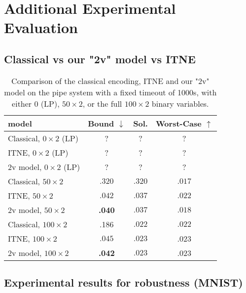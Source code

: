 	\section{Additional Experimental Evaluation}
	

\subsection{Classical vs our "2v" model vs ITNE}




\begin{table}[h!]
	\centering
	\begin{tabular}{||l|c|c|c||}\hline\hline
		model &        Bound $\downarrow$ &  Sol. &      Worst-Case $\uparrow$ \\\hline \hline
	Classical, $0 \times 2$ (LP)&  ? & ? & ?
    \\\hline
	ITNE, $0 \times 2$ (LP) &    ? & ? & ?
    \\\hline
	2v model, $0 \times 2$ (LP) &    ? & ? & ?
    \\\hline \hline
	
		Classical, $50 \times 2$ &    $.320$ &  $.320$ & $.017$ 
    \\\hline
	ITNE, $50 \times 2$ &    $.042$ &  $.037$ & $.022$
	\\ \hline
    2v model, $50 \times 2$ &    {\bf .040} &  $.037$ &  $.018$ 
    \\\hline \hline
    Classical, $100 \times 2$ &  .186  &  $.022$ & $.022$ 
    \\\hline
	ITNE, $100 \times 2$ &    $.045$ &  $.023$ & .023
    \\\hline
	2v model, $100 \times 2$&     {\bf .042} &  $.023$ &   .023 
    \\\hline \hline
	\end{tabular}
	\caption{Comparison of the classical encoding, ITNE and our "2v" model on the pipe system 
	with a fixed timeout of 1000s, with either 0 (LP), $50 \times 2$, 
    or the full $100 \times 2$ binary variables.}
    \label{table.classical}
\end{table}





	\subsection{Experimental results for robustness (MNIST)}
	
